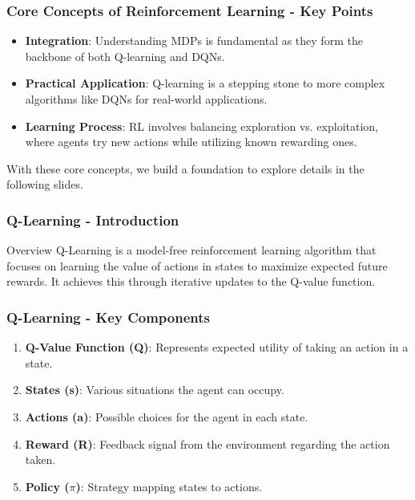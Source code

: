 \documentclass[aspectratio=169]{beamer}
\begin{document}
\begin{frame}[fragile]
    \frametitle{Core Concepts of Reinforcement Learning - Key Points}
    \begin{itemize}
        \item \textbf{Integration}: Understanding MDPs is fundamental as they form the backbone of both Q-learning and DQNs.
        \item \textbf{Practical Application}: Q-learning is a stepping stone to more complex algorithms like DQNs for real-world applications.
        \item \textbf{Learning Process}: RL involves balancing exploration vs. exploitation, where agents try new actions while utilizing known rewarding ones.
    \end{itemize}
    With these core concepts, we build a foundation to explore details in the following slides.
\end{frame}

\begin{frame}[fragile]
    \frametitle{Q-Learning - Introduction}
    \begin{block}{Overview}
        Q-Learning is a model-free reinforcement learning algorithm that focuses on learning the value of actions in states to maximize expected future rewards. It achieves this through iterative updates to the Q-value function.
    \end{block}
\end{frame}

\begin{frame}[fragile]
    \frametitle{Q-Learning - Key Components}
    \begin{enumerate}
        \item \textbf{Q-Value Function (Q)}: Represents expected utility of taking an action in a state.
        \item \textbf{States (s)}: Various situations the agent can occupy.
        \item \textbf{Actions (a)}: Possible choices for the agent in each state.
        \item \textbf{Reward (R)}: Feedback signal from the environment regarding the action taken.
        \item \textbf{Policy ($\pi$)}: Strategy mapping states to actions.
    \end{enumerate}
\end{frame}
\end{document}
